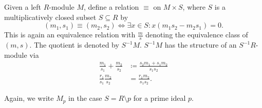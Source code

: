 Given a left $R$-module $M$, define a relation $\equiv$ on $M\times S$, where
$S$ is a multiplicatively closed subset $S \subseteq R$ by
\[ (m_1, s_1) \equiv (m_2, s_2) \iff \exists x \in S\colon x(m_1s_2 - m_2s_1) = 0. \]
This is again an equivalence relation with $\frac{m}{s}$ denoting the equivalence
class of $(m, s)$. The quotient is denoted by $S^{-1}M$. $S^{-1}M$ has the structure
of an $S^{-1}R$-module via
\begin{align*}
	\frac{m_1}{s_1}+ \frac{m_2}{s_2}&\coloneqq \frac{s_2m_1+s_1m_2}{s_1s_2}\\
	\frac{r_1}{s_1}\frac{m_2}{s_2}&= \frac{r_1m_2}{s_1s_2}.
\end{align*}

Again, we write $M_p$ in the case $S = R\setminus p$ for a prime ideal $p$.
